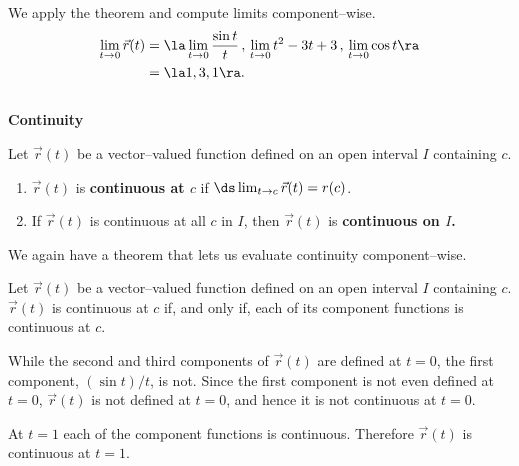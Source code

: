 {We apply the theorem and compute limits component--wise.
\begin{align*}
\lim_{t\to0} \vec r(t) &= \la \lim_{t\to 0}\frac{\sin t}{t}\, , \, \lim_{t\to 0} t^2-3t+3\, , \, \lim_{t\to 0} \cos t\ra \\
			&= \la 1,3,1\ra.
\end{align*}
\baselineskip
}\\

\noindent\textbf{\large Continuity}\\

{Let $\vec r(t)$ be a vector--valued function defined on an open interval $I$ containing $c$.
\begin{enumerate}
	\item $\vec r(t)$ is \textbf{continuous at $c$} if $\ds \lim_{t\to c} \vec r(t) = r(c)$.
	\item	If $\vec r(t)$ is continuous at all $c$ in $I$, then $\vec r(t)$ is \textbf{continuous on $I$.}
\end{enumerate}
}

We again have a theorem that lets us evaluate continuity component--wise.
\enlargethispage{2\baselineskip}

{Let $\vec r(t)$ be a vector--valued function defined on an open interval $I$ containing $c$. $\vec r(t)$ is continuous at $c$ if, and only if, each of its component functions is continuous at $c$.
}\\

{While the second and third components of $\vec r(t)$ are defined at $t=0$, the first component, $(\sin t)/t$, is not. Since the first component is not even defined at $t=0$, $\vec r(t)$ is not defined at $t=0$, and hence it is not continuous at $t=0$.

At $t=1$ each of the component functions is continuous. Therefore $\vec r(t)$ is continuous at $t=1$.
}\\

